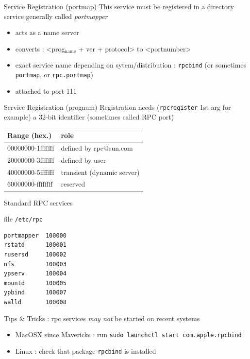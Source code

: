 \documentclass[bigger,hyperref={colorlinks=true, urlcolor=red, plainpages=false, pdfpagelabels, bookmarksnumbered}]{beamer}
\begin{document}
\begin{frame}[fragile,label=sec-2-4]{Service Registration (portmap)}
 This service must be registered in a directory service generally called \emph{portmapper} 
\begin{itemize}
\item acts as a name server
\item converts : <prog$_{\text{name}}$ + ver + protocol> to <portnumber>
\item exact service name depending on sytem/distribution : \texttt{rpcbind} (or sometimes \texttt{portmap}, or \texttt{rpc.portmap})
\item attached to port 111
\end{itemize}
\end{frame}

\begin{frame}[fragile,label=sec-2-5]{Service Registration (prognum)}
 Registration needs (\texttt{rpcregister} 1st arg for example)
a 32-bit identifier (sometimes called RPC port) 

\begin{center}
\begin{tabular}{ll}
Range (hex.) & role\\
\hline
00000000-1fffffff & defined by rpc@sun.com\\
20000000-3fffffff & defined by user\\
40000000-5fffffff & transient (dynamic server)\\
60000000-ffffffff & reserved\\
\end{tabular}
\end{center}
\end{frame}


\begin{frame}[fragile,label=sec-2-6]{Standard RPC services}
 \begin{block}{file \texttt{/etc/rpc}}
\lstset{language=C,label= ,caption= ,numbers=none}
\begin{lstlisting}
portmapper  100000  
rstatd      100001  
rusersd     100002  
nfs         100003  
ypserv      100004 
mountd      100005 
ypbind      100007
walld       100008
\end{lstlisting}
\end{block}

\begin{block}{Tips \& Tricks : rpc services \emph{may not} be started on recent systems}
\begin{itemize}
\item MacOSX since Mavericks : run \texttt{sudo launchctl start com.apple.rpcbind}
\item Linux : check that package \texttt{rpcbind} is installed
\end{itemize}
\end{block}
\end{frame}
\end{document}
